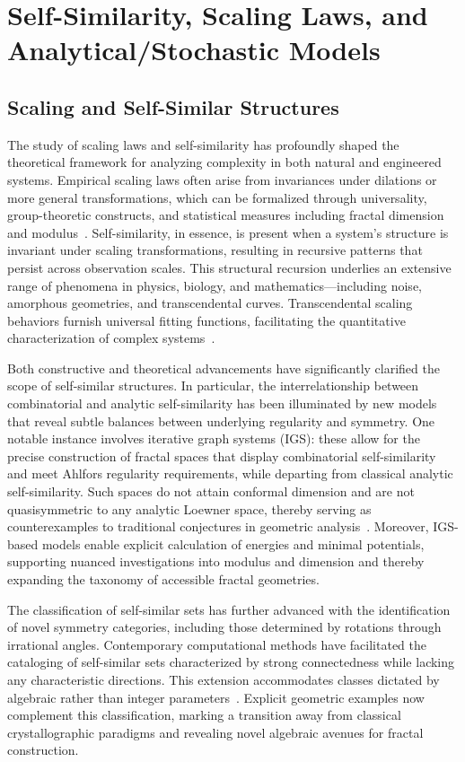\documentclass[sigconf]{acmart}
\begin{document}
\section{Self-Similarity, Scaling Laws, and Analytical/Stochastic Models}

\subsection{Scaling and Self-Similar Structures}

The study of scaling laws and self-similarity has profoundly shaped the theoretical framework for analyzing complexity in both natural and engineered systems. Empirical scaling laws often arise from invariances under dilations or more general transformations, which can be formalized through universality, group-theoretic constructs, and statistical measures including fractal dimension and modulus~\cite{ref56,ref63}. Self-similarity, in essence, is present when a system's structure is invariant under scaling transformations, resulting in recursive patterns that persist across observation scales. This structural recursion underlies an extensive range of phenomena in physics, biology, and mathematics—including noise, amorphous geometries, and transcendental curves. Transcendental scaling behaviors furnish universal fitting functions, facilitating the quantitative characterization of complex systems~\cite{ref56}.

Both constructive and theoretical advancements have significantly clarified the scope of self-similar structures. In particular, the interrelationship between combinatorial and analytic self-similarity has been illuminated by new models that reveal subtle balances between underlying regularity and symmetry. One notable instance involves iterative graph systems (IGS): these allow for the precise construction of fractal spaces that display combinatorial self-similarity and meet Ahlfors regularity requirements, while departing from classical analytic self-similarity. Such spaces do not attain conformal dimension and are not quasisymmetric to any analytic Loewner space, thereby serving as counterexamples to traditional conjectures in geometric analysis~\cite{ref11}. Moreover, IGS-based models enable explicit calculation of energies and minimal potentials, supporting nuanced investigations into modulus and dimension and thereby expanding the taxonomy of accessible fractal geometries.

The classification of self-similar sets has further advanced with the identification of novel symmetry categories, including those determined by rotations through irrational angles. Contemporary computational methods have facilitated the cataloging of self-similar sets characterized by strong connectedness while lacking any characteristic directions. This extension accommodates classes dictated by algebraic rather than integer parameters~\cite{ref31}. Explicit geometric examples now complement this classification, marking a transition away from classical crystallographic paradigms and revealing novel algebraic avenues for fractal construction.
\end{document}
